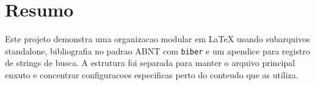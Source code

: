 \section*{Resumo}

Este projeto demonstra uma organizacao modular em \LaTeX{} usando subarquivos
standalone, bibliografia no padrao ABNT com \texttt{biber} e um apendice para
registro de strings de busca. A estrutura foi separada para manter o arquivo
principal enxuto e concentrar configuracoes especificas perto do conteudo que as
utiliza.
